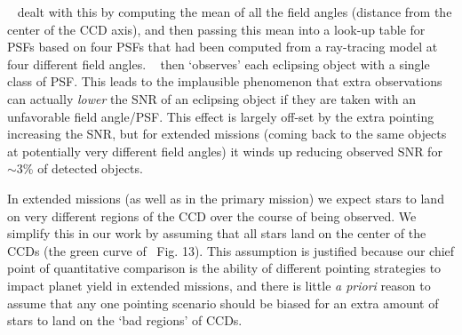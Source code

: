 \begin{appendices}
~ dealt with this by computing the mean of all the field angles (distance from the center of the CCD axis), and then passing this mean into a look-up table for PSFs based on four PSFs that had been computed from a ray-tracing model at four different field angles.
~ then `observes' each eclipsing object with a single class of PSF.
This leads to the implausible phenomenon that extra observations can actually \textit{lower} the SNR of an eclipsing object if they are taken with an unfavorable field angle/PSF. 
This effect is largely off-set by the extra pointing increasing the SNR, but for extended missions (coming back to the same objects at potentially very different field angles) it winds up reducing observed SNR for $\sim$3\% of detected objects.

In extended missions (as well as in the primary mission) we expect stars to land on very different regions of the CCD over the course of being observed.
We simplify this in our work by assuming that all stars land on the center of the \tess CCDs (the green curve of~ Fig. 13). 
This assumption is justified because our chief point of quantitative comparison is the ability of different pointing strategies to impact \tesss planet yield in extended missions, and there is little \textit{a priori} reason to assume that any one pointing scenario should be biased for an extra amount of stars to land on the `bad regions' of \tesss CCDs.
	

\end{appendices}